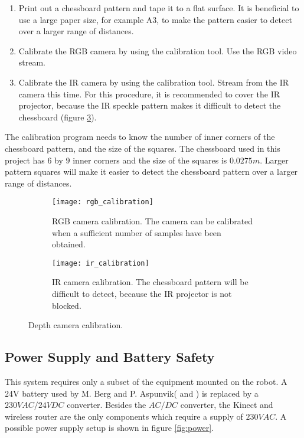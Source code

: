 \begin{enumerate}
	\item Print out a chessboard pattern and tape it to a flat surface. It is beneficial to use a large paper size, for example A3, to make the pattern easier to detect over a larger range of distances.
	\item Calibrate the RGB camera by using the calibration tool. Use the RGB video stream.
	\item Calibrate the IR camera by using the calibration tool. Stream from the IR camera this time. For this procedure, it is recommended to cover the IR projector, because the IR speckle pattern makes it difficult to detect the chessboard (figure \ref{fig:ir_calibration}).
\end{enumerate}

The calibration program needs to know the number of inner corners of the chessboard pattern, and the size of the squares. The chessboard used in this project has $6$ by $9$ inner corners and the size of the squares is $0.0275 m$. Larger pattern squares will make it easier to detect the chessboard pattern over a larger range of distances.

 \begin{figure}[h]
 	\centering
 	\begin{subfigure}[b]{0.47\textwidth}
 		\texttt{[image: rgb\_calibration]}
 		\caption{RGB camera calibration. The camera can be calibrated when a sufficient number of samples have been obtained.}
 		\label{fig:rgb_calibration}
 	\end{subfigure}
 	\begin{subfigure}[b]{0.47\textwidth}
 		
 		\texttt{[image: ir\_calibration]}
 		\caption{IR camera calibration. The chessboard pattern will be difficult to detect, because the IR projector is not blocked.}
 		\label{fig:ir_calibration}
 	\end{subfigure}
 	\caption{Depth camera calibration.}
 \end{figure}

\subsection{Power Supply and Battery Safety}

This system requires only a subset of the equipment mounted on the robot. A 24V battery used by M. Berg and P. Aspunvik(\cite{berg} and \cite{aspunvik}) is replaced by a $230VAC/24VDC$ converter. Besides the $AC/DC$ converter, the Kinect and wireless router are the only components which require a supply of $230V AC$. A possible power supply setup is shown in figure \ref{fig:power}.

